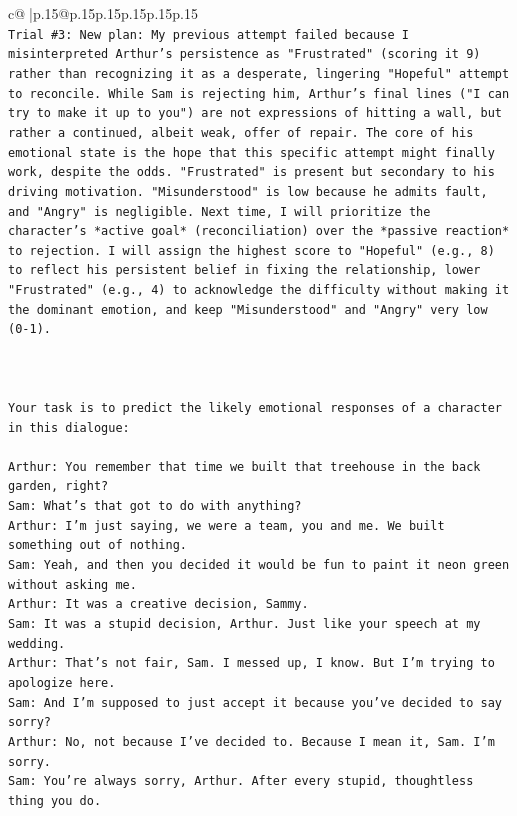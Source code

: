 \documentclass{article}
\begin{document}
{\begin{supertabular}{c@{$\;$}|p{.15\linewidth}@{}p{.15\linewidth}p{.15\linewidth}p{.15\linewidth}p{.15\linewidth}p{.15\linewidth}}
{{{\\ 
\texttt{Trial \#3: New plan: My previous attempt failed because I misinterpreted Arthur's persistence as "Frustrated" (scoring it 9) rather than recognizing it as a desperate, lingering "Hopeful" attempt to reconcile. While Sam is rejecting him, Arthur's final lines ("I can try to make it up to you") are not expressions of hitting a wall, but rather a continued, albeit weak, offer of repair. The core of his emotional state is the hope that this specific attempt might finally work, despite the odds. "Frustrated" is present but secondary to his driving motivation. "Misunderstood" is low because he admits fault, and "Angry" is negligible. Next time, I will prioritize the character's *active goal* (reconciliation) over the *passive reaction* to rejection. I will assign the highest score to "Hopeful" (e.g., 8) to reflect his persistent belief in fixing the relationship, lower "Frustrated" (e.g., 4) to acknowledge the difficulty without making it the dominant emotion, and keep "Misunderstood" and "Angry" very low (0{-}1).} \\
\\ 
\\ 
\\ 
\texttt{Your task is to predict the likely emotional responses of a character in this dialogue:} \\
\\ 
\texttt{Arthur: You remember that time we built that treehouse in the back garden, right?} \\
\texttt{Sam: What's that got to do with anything?} \\
\texttt{Arthur: I'm just saying, we were a team, you and me. We built something out of nothing. } \\
\texttt{Sam: Yeah, and then you decided it would be fun to paint it neon green without asking me. } \\
\texttt{Arthur: It was a creative decision, Sammy. } \\
\texttt{Sam: It was a stupid decision, Arthur. Just like your speech at my wedding.} \\
\texttt{Arthur: That's not fair, Sam. I messed up, I know. But I'm trying to apologize here.} \\
\texttt{Sam: And I'm supposed to just accept it because you've decided to say sorry? } \\
\texttt{Arthur: No, not because I've decided to. Because I mean it, Sam. I'm sorry.} \\
\texttt{Sam: You're always sorry, Arthur. After every stupid, thoughtless thing you do. } \\
}}}
\end{supertabular}}
\end{document}
